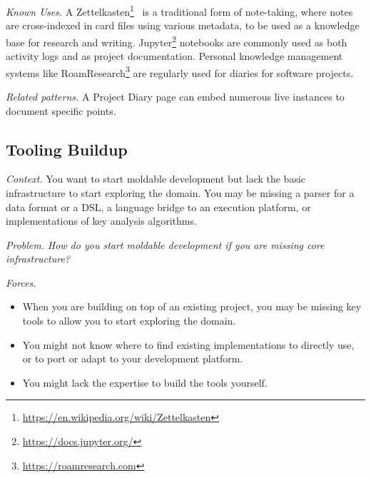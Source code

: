 \documentclass[sigconf,screen]{acmart}
\newcommand\kh[1]{\nbc{Konrad}{#1}{violet}}
\newcommand\cp[1]{\nbe{Cesare}{#1}{olive}} %
\newcommand\dd[1]{\nbe{Daniel}{#1}{magenta}} %
\newcommand{\pattern}[2]{\needlines{10}
\subsection*{#1}\label{pat:#2}}
\newcommand{\patref}[1]{\emph{\nameref{pat:#1}}\xspace}
\newcommand{\patsec}[1]{\noindent\textit{#1.}\xspace}
\begin{document}
\patsec{Known Uses}
A Zettelkasten\footnote{\href{https://web.archive.org/web/20240917092258/https://en.wikipedia.org/wiki/Zettelkasten}{https://en.wikipedia.org/wiki/Zettelkasten}}~\cite{Luhm81a} is a traditional form of note-taking, where notes are cross-indexed in card files using various metadata, to be used as a knowledge base for research and writing.
Jupyter\footnote{\href{https://web.archive.org/web/20240820082136/https://docs.jupyter.org/en/latest/}{https://docs.jupyter.org/}} notebooks are commonly used as both activity logs and as project documentation.
Personal knowledge management systems like RoamResearch\footnote{\href{https://web.archive.org/web/20240820082136/https://docs.jupyter.org/en/latest/}{https://roamresearch.com}} are regularly used for diaries for software projects.

\patsec{Related patterns}
A Project Diary page can embed numerous live \patref{ExampleObject} instances to document specific points.

\pattern{Tooling Buildup}{ToolingBuildup}


\patsec{Context}
You want to start moldable development but lack the basic infrastructure 
to start exploring the domain.
You may be missing a parser for a data format or a DSL, a language bridge to an execution platform, or implementations of key analysis algorithms. 

\patsec{Problem}
\emph{How do you start moldable development if you are missing core infrastructure?}

\patsec{Forces}
\begin{itemize}[---]
\item When you are building on top of an existing project, you may be missing key tools to allow you to start exploring the domain.
\item You might not know where to find existing implementations to directly use, or to port or adapt to your development platform.
\item You might lack the expertise to build the tools yourself.
\end{itemize}
\end{document}
